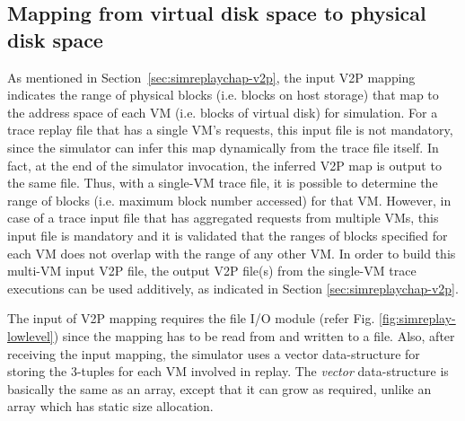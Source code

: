 \subsection{Mapping from virtual disk space to physical disk space}
As mentioned in Section~\ref{sec:simreplaychap-v2p},
the input V2P mapping
indicates the range of physical blocks (i.e. blocks on host storage)
that map to the address space of each VM (i.e. blocks of virtual disk)
for simulation. 
For a trace replay file that has a single VM's requests, 
this input file is not mandatory, since the simulator can infer this map
dynamically from the trace file itself. 
In fact, at the end of the 
simulator invocation, the inferred V2P map is output to the same
file. Thus, with a single-VM trace file, it is possible to determine
the range of blocks (i.e. maximum block number accessed) for that VM.
However, in case of a trace input
file that has aggregated requests from multiple VMs, this input file is 
mandatory and it is validated that the ranges of blocks specified for 
each VM does not overlap with the range of any other VM. 
In order to
build this multi-VM input V2P file, the output V2P file(s) from the single-VM
trace executions can be used additively, as indicated in 
Section \ref{sec:simreplaychap-v2p}.

The input of V2P mapping requires the file 
I/O module (refer Fig. \ref{fig:simreplay-lowlevel}) since the mapping
has to be read from and written to a file. Also, after receiving the 
input mapping, the simulator uses a vector data-structure for storing
the 3-tuples for each VM involved in replay.
The \textit{vector} data-structure is basically the same as an array, 
except that it can grow as required, unlike an array which has static
size allocation.


